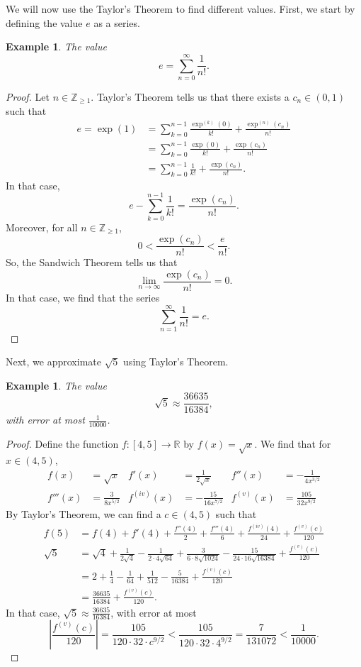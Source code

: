 \documentclass[a4paper, openany]{memoir}
\theoremstyle{definition}
\theoremstyle{plain}
\newtheorem{example}[definition]{Example}
\begin{document}
We will now use the Taylor's Theorem to find different values. First, we start by defining the value $e$ as a series.
\begin{example}
The value
\[e = \sum_{n=0}^{\infty} \frac{1}{n!}.\]
\end{example}
\begin{proof}
Let $n \in \mathbb{Z}_{\geqslant 1}$. Taylor's Theorem tells us that there exists a $c_n \in (0, 1)$ such that
\begin{align*}
    e = \exp(1) &= \sum_{k=0}^{n-1} \frac{\exp^{(k)}(0)}{k!} + \frac{\exp^{(n)}(c_n)}{n!} \\
    &= \sum_{k=0}^{n-1} \frac{\exp(0)}{k!} + \frac{\exp(c_n)}{n!} \\
    &= \sum_{k=0}^{n-1} \frac{1}{k!} + \frac{\exp (c_n)}{n!}.
\end{align*}
In that case,
\[e - \sum_{k=0}^{n-1} \frac{1}{k!} = \frac{\exp(c_n)}{n!}.\]
Moreover, for all $n \in \mathbb{Z}_{\geqslant 1}$,
\[0 < \frac{\exp(c_n)}{n!} < \frac{e}{n!}.\]
So, the Sandwich Theorem tells us that
\[\lim_{n \to \infty} \frac{\exp(c_n)}{n!} = 0.\]
In that case, we find that the series
\[\sum_{n=1}^{\infty} \frac{1}{n!} = e.\]
\end{proof}
\noindent Next, we approximate $\sqrt{5}$ using Taylor's Theorem.
\begin{example}
The value
\[\sqrt{5} \approx \frac{36635}{16384},\]
with error at most $\frac{1}{10 000}$.
\end{example}
\begin{proof}
Define the function $f: [4, 5] \to \mathbb{R}$ by $f(x) = \sqrt{x}$. We find that for $x \in (4, 5)$,
\begin{align*}
    f(x) &= \sqrt{x} & f'(x) &= \frac{1}{2\sqrt{x}} & f''(x) &= -\frac{1}{4 x^{3/2}} \\
    f'''(x) &= \frac{3}{8 x^{5/2}} & f^{(iv)}(x) &= -\frac{15}{16 x^{7/2}} & f^{(v)}(x) &= \frac{105}{32 x^{9/2}}
\end{align*}
By Taylor's Theorem, we can find a $c \in (4, 5)$ such that
\begin{align*}
    f(5) &= f(4) + f'(4) + \frac{f''(4)}{2} + \frac{f'''(4)}{6} + \frac{f^{(iv)}(4)}{24} + \frac{f^{(v)}(c)}{120} \\
    \sqrt{5} &= \sqrt{4} + \frac{1}{2 \sqrt{4}} - \frac{1}{2 \cdot 4 \sqrt{64}} + \frac{3}{6 \cdot 8 \sqrt{1024}} - \frac{15}{24 \cdot 16\sqrt{16384}} + \frac{f^{(v)}(c)}{120} \\
    &= 2 + \frac{1}{4} - \frac{1}{64} + \frac{1}{512} - \frac{5}{16384} + \frac{f^{(v)}(c)}{120} \\
    &= \frac{36635}{16384} + \frac{f^{(v)}(c)}{120}.
\end{align*}
In that case, $\sqrt{5} \approx \frac{36635}{16384}$, with error at most
\[\left|\frac{f^{(v)}(c)}{120}\right| = \frac{105}{120 \cdot 32 \cdot c^{9/2}} < \frac{105}{120 \cdot 32 \cdot 4^{9/2}} = \frac{7}{131072} < \frac{1}{10000}.\]
\end{proof}
\end{document}
